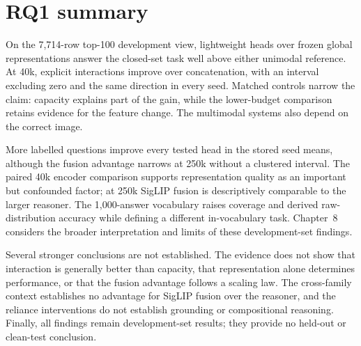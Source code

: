\clearpage
\section{RQ1 summary}
\label{sec:ch4-summary}
On the 7,714-row top-100 development view, lightweight heads over frozen
global representations answer the closed-set task well above either unimodal
reference. At 40k,
explicit interactions improve over concatenation, with an interval excluding
zero and the same direction in every seed. Matched controls narrow the claim:
capacity explains part of the gain, while the lower-budget comparison retains
evidence for the feature change. The multimodal systems also depend on the
correct image.

More labelled questions improve every tested head in the stored seed means,
although the fusion advantage narrows at 250k without a clustered interval.
The paired 40k encoder comparison supports representation quality as an
important but confounded factor; at 250k SigLIP fusion is descriptively comparable to the larger
reasoner. The 1,000-answer vocabulary raises coverage and derived
raw-distribution accuracy while defining a different in-vocabulary task.
Chapter~8 considers the broader interpretation and limits of these
development-set findings.

Several stronger conclusions are not established. The evidence does not show
that interaction is generally better than capacity, that representation alone
determines performance, or that the fusion advantage follows a scaling law.
The cross-family context establishes no advantage for SigLIP fusion over the
reasoner, and
the reliance interventions do not establish grounding or compositional
reasoning. Finally, all findings remain development-set results; they provide
no held-out or clean-test conclusion.

\fussy
